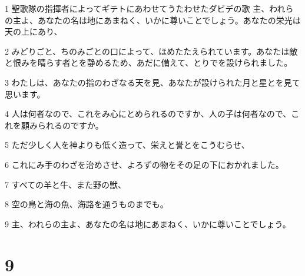 \par 1 聖歌隊の指揮者によってギテトにあわせてうたわせたダビデの歌 主、われらの主よ、あなたの名は地にあまねく、いかに尊いことでしょう。あなたの栄光は天の上にあり、
\par 2 みどりごと、ちのみごとの口によって、ほめたたえられています。あなたは敵と恨みを晴らす者とを静めるため、あだに備えて、とりでを設けられました。
\par 3 わたしは、あなたの指のわざなる天を見、あなたが設けられた月と星とを見て思います。
\par 4 人は何者なので、これをみ心にとめられるのですか、人の子は何者なので、これを顧みられるのですか。
\par 5 ただ少しく人を神よりも低く造って、栄えと誉とをこうむらせ、
\par 6 これにみ手のわざを治めさせ、よろずの物をその足の下におかれました。
\par 7 すべての羊と牛、また野の獣、
\par 8 空の鳥と海の魚、海路を通うものまでも。
\par 9 主、われらの主よ、あなたの名は地にあまねく、いかに尊いことでしょう。

\chapter{9}

